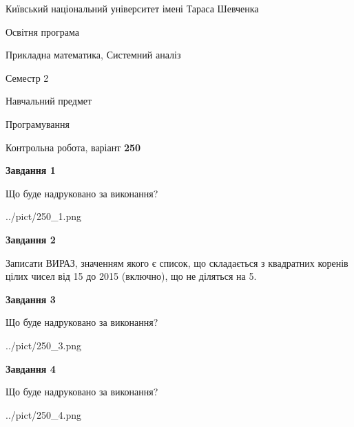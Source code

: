 \documentclass[12pt, ukrainian]{article}
\begin{document}
{{\begin {small}\par
{ \center  Київський національний університет імені Тараса Шевченка \par}
{\parbox {5 cm}{Освітня програма \hfill}{\parbox {8 cm}{Прикладна математика, Системний аналіз \hfill}}\parbox {5 cm}{\hfill Семестр 2}}\par
{\parbox {5 cm} {Навчальний предмет \hfill}\parbox {7 cm}{Програмування \hfill}\parbox {6cm}{\hfill}\par}\vspace{-7pt} \end{small}}{\center Контрольна робота, варіант  \No \textbf
{ 250 }\par}}
{
\begin {large}
{\begin {center}\textbf{Завдання 1}\end {center}}\par
Що буде надруковано за виконання?\par\par
\begin{center}
	{../pict/250_1.png}
\end{center}
\newpage

{\begin {center}\textbf{Завдання 2}\end {center}}\par

Записати ВИРАЗ, значенням якого є список, що складається з квадратних коренів цілих чисел від 15 до 2015 (включно), що не діляться на 5.\par
\newpage

{\begin {center}\textbf{Завдання 3}\end {center}}\par
Що буде надруковано за виконання?
\begin{center}
	{../pict/250_3.png}
\end{center}
\newpage

{\begin {center}\textbf{Завдання 4}\end {center}}\par
Що буде надруковано за виконання?\par
\begin{center}
	{../pict/250_4.png}
\end{center}
\newpage


\end{large}}
\end{document}
